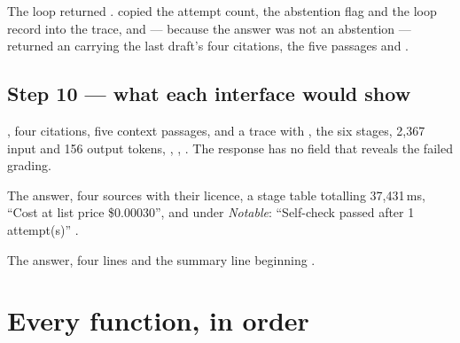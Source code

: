 The loop returned .  copied the attempt count, the abstention flag and the loop record into the trace, and --- because the answer was not an abstention --- returned an  carrying the last draft's four citations, the five passages and  .

\subsection{Step 10 --- what each interface would show}

\begin{description}[style=nextline]
  \item[HTTP API.] , four citations, five context passages, and a trace with , the six stages, 2,367 input and 156 output tokens, , , . The response has no field that reveals the failed grading.
  \item[Demo.] The answer, four sources with their licence, a stage table totalling 37,431\,ms, \enquote{Cost at list price \$0.00030}, and under \emph{Notable}: \enquote{Self-check passed after 1 attempt(s)} .
  \item[CLI.] The answer, four  lines and the summary line beginning .
\end{description}

\section{Every function, in order}

